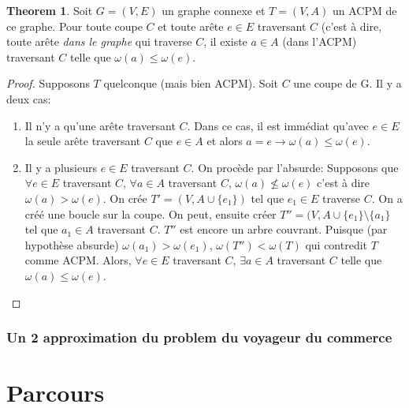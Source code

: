 \documentclass[french]{article}
\theoremstyle{definition}
\newtheorem{theorem}{Theorem}[section]
\begin{document}
		\begin{theorem} Soit $G = (V, E)$ un graphe connexe et $T = (V, A)$ un ACPM de ce graphe. Pour toute coupe $C$ et toute arête $e \in E$ traversant $C$ (c'est à dire, toute arête \textit{dans le graphe} qui traverse $C$, il existe $a \in A$ (dans l'ACPM) traversant $C$ telle que $\omega(a) \leq \omega(e)$.
			\begin{proof}
				Supposons $T$ quelconque (mais bien ACPM). Soit $C$ une coupe de G. Il y a deux cas:
				\begin{enumerate}
					\item Il n'y a qu'une arête traversant $C$. Dans ce cas, il est immédiat qu'avec $e \in E$ la seule arête traversant $C$ que $e \in A$ et alors $a = e \to \omega(a) \leq \omega(e)$.
					\item Il y a plusieurs $e \in E$ traversant $C$. On procède par l'absurde: Supposons que $\forall e \in E$ traversant $C$, $\forall a \in A$ traversant $C$, $\omega(a) \nleq \omega(e)$ c'est à dire $\omega(a) > \omega(e)$. On crée $T' = (V, A \cup \{e_1\})$ tel que $e_1 \in E$ traverse $C$. On a créé une boucle sur la coupe. On peut, ensuite créer $T'' = (V, A \cup \{e_1\} \setminus \{a_1\}$ tel que $a_1 \in A$ traversant $C$. $T''$ est encore un arbre couvrant. Puisque (par hypothèse absurde) $\omega(a_1) > \omega(e_1)$, $\omega(T'') < \omega(T)$ qui contredit $T$ comme ACPM. Alors, $\forall e \in E$ traversant $C$, $\exists a \in A$ traversant $C$ telle que $\omega(a) \leq \omega(e)$.
				\end{enumerate}
			\end{proof}
		\end{theorem}
		\subsubsection{Un 2 approximation du problem du voyageur du commerce}

		\section{Parcours}
\end{document}
